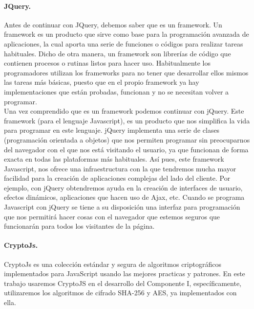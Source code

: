 \documentclass[12pt, a4paper, titlepage]{report}
\begin{document}
			\paragraph{JQuery. \\}
			 Antes de continuar con JQuery, debemos saber que es un framework. Un framework es un producto que sirve como base para la programación avanzada de aplicaciones, la cual aporta una serie de funciones o códigos para realizar tareas habituales. Dicho de otra manera, un framework son librerías de código que contienen procesos o rutinas listos para hacer uso. Habitualmente los programadores utilizan los frameworks para no tener que desarrollar ellos mismos las tareas más básicas, puesto que en el propio framework ya hay implementaciones que están probadas, funcionan y no se necesitan volver a programar.\\
			 
			 Una vez comprendido que es un framework podemos continuar con jQuery. Este framework (para el lenguaje Javascript), es un producto que nos simplifica la vida para programar en este lenguaje. jQuery implementa una serie de clases (programación orientada a objetos) que nos permiten programar sin preocuparnos del navegador con el que nos está visitando el usuario, ya que funcionan de forma exacta en todas las plataformas más habituales. Así pues, este framework Javascript, nos ofrece una infraestructura con la que tendremos mucha mayor facilidad para la creación de aplicaciones complejas del lado del cliente. Por ejemplo, con jQuery obtendremos ayuda en la creación de interfaces de usuario, efectos dinámicos, aplicaciones que hacen uso de Ajax, etc. Cuando se programa Javascript con jQuery se tiene a su disposición una interfaz para programación que nos permitirá hacer cosas con el navegador que estemos seguros que funcionarán para todos los visitantes de la página.\cite{refJQuery}\\
			
			\paragraph{CryptoJs. \\}
			CryptoJs es una colección estándar y segura de algoritmos criptográficos implementados para JavaScript usando las mejores practicas y patrones. En este trabajo usaremos CryptoJS en el desarrollo del Componente I, específicamente, utilizaremos los algoritmos de cifrado SHA-256 y AES, ya implementados con ella.\cite{refCryptoJs} 
			
\end{document}
